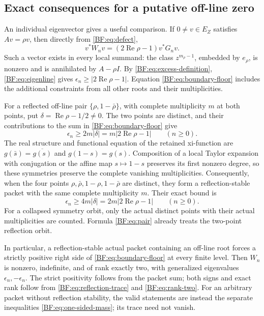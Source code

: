 \subsection{Exact consequences for a putative off-line zero}
\label{BF:counterfactual}

An individual eigenvector gives a useful comparison.
If \(0\ne v\in E_Z\) satisfies \(Av=\rho v\), then directly from
\eqref{BF:eq:defect},
\begin{equation}
v^*W_nv=(2\operatorname{Re}\rho-1)v^*G_nv.
\tag{BF.37}\label{BF:eq:eigenline}
\end{equation}
Such a vector exists in every local summand: the class
\(z^{m_\rho-1}\), embedded by \(e_\rho\), is nonzero and is
annihilated by \(A-\rho I\).  By
\eqref{BF:eq:excess-definition}, \eqref{BF:eq:eigenline} gives
\(\epsilon_n\ge|2\operatorname{Re}\rho-1|\).
Equation \eqref{BF:eq:boundary-floor} includes the additional
constraints from all other roots and their multiplicities.

For a reflected off-line pair
\(\{\rho,1-\bar\rho\}\), with complete multiplicity \(m\) at both
points, put \(\delta=\operatorname{Re}\rho-1/2\ne0\).
The two points are distinct, and their contributions to the sum
in \eqref{BF:eq:boundary-floor} give
\begin{equation}
\epsilon_n\ge2m|\delta|
 =m|2\operatorname{Re}\rho-1|
 \qquad(n\ge0).
\tag{BF.38}\label{BF:eq:pair}
\end{equation}
The real structure and functional equation of the retained
xi-function are \(g(\bar s)=\overline{g(s)}\) and \(g(1-s)=g(s)\).
Composition of a local Taylor expansion with conjugation or the
affine map \(s\mapsto1-s\) preserves its first nonzero degree, so
these symmetries preserve the complete vanishing multiplicities.
Consequently, when the four points
\(\rho,\bar\rho,1-\rho,1-\bar\rho\) are distinct, they form a
reflection-stable packet with the same complete multiplicity \(m\).
Their exact bound is
\begin{equation}
\epsilon_n\ge4m|\delta|
 =2m|2\operatorname{Re}\rho-1|
 \qquad(n\ge0).
\tag{BF.39}\label{BF:eq:quartet}
\end{equation}
For a collapsed symmetry orbit, only the actual distinct points
with their actual multiplicities are counted.  Formula
\eqref{BF:eq:pair} already treats the two-point reflection orbit.

In particular, a reflection-stable actual packet containing an
off-line root forces a strictly positive right side of
\eqref{BF:eq:boundary-floor} at every finite level.
Then \(W_n\) is nonzero, indefinite, and of rank exactly two,
with generalized eigenvalues \(\epsilon_n,-\epsilon_n\).
The strict positivity follows from the packet sum; both signs
and exact rank follow from \eqref{BF:eq:reflection-trace}
and \eqref{BF:eq:rank-two}.  For an arbitrary packet without
reflection stability, the valid statements are instead the
separate inequalities \eqref{BF:eq:one-sided-mass}; its trace
need not vanish.

